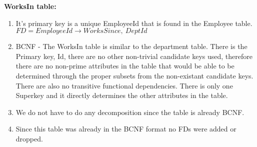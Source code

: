 \documentclass{article}
\begin{document}
  \par\textbf{WorksIn table:}
  \begin{enumerate}[label=\roman*]
  	\item It's primary key is a unique EmployeeId that is found in the Employee table. \newline
    $FD = EmployeeId \rightarrow WorksSince,\ DeptId$
  	\item BCNF - The WorksIn table is similar to the department table. There is the Primary key, Id, there are no other non-trivial candidate keys used, therefore there are no non-prime attributes in the table that would be able to be determined through the proper subsets from the non-existant candidate keys. There are also no transitive functional dependencies. There is only one Superkey and it directly determines the other attributes in the table.
  	\item We do not have to do any decomposition since the table is already BCNF.
  	\item Since this table was already in the BCNF format no FDs were added or dropped.
  \end{enumerate}
\end{document}

